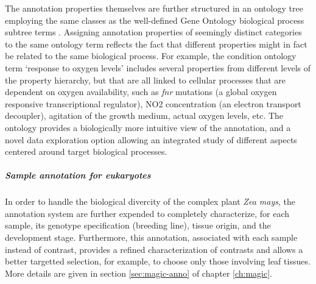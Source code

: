 %
The annotation properties themselves are further structured in an ontology
tree employing the same classes as the well-defined Gene Ontology biological
process subtree terms \cite{Gene2010}.
%
Assigning annotation properties of seemingly distinct categories to the same
ontology term reflects the fact that different properties might in fact be
related to the same biological process. 
%
For example, the condition ontology term ‘response to oxygen levels’ includes
several properties from different levels of the property hierarchy, but that
are all linked to cellular processes that are dependent on oxygen
availability, such as \textit{fnr} mutations (a global oxygen responsive
transcriptional regulator), NO2 concentration (an electron transport
decoupler), agitation of the growth medium, actual oxygen levels, etc.
%
The ontology provides a biologically more intuitive view of the annotation, and
a novel data exploration option allowing an integrated study of different
aspects centered around target biological processes.


\subparagraph{Sample annotation for eukaryotes}
%
In order to handle the biological divercity of the complex plant \textit{Zea
  mays}, the annotation system are further expended to completely
characterize, for each sample, its genotype specification (breeding line),
tissue origin, and the development stage.
%
Furthermore, this annotation, associated with each sample instead of contrast,
provides a refined characterization of contrasts and allows a better targetted
selection, for example, to choose only those involving leaf tissues.
%
More details are given in section \ref{sec:magic-anno} of chapter \ref{ch:magic}.




